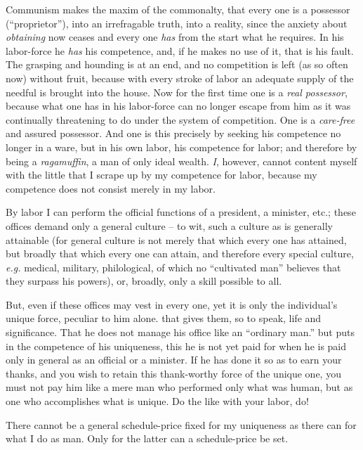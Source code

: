 Communism makes the maxim of the commonalty, that every one is a possessor 
(``proprietor''), into an irrefragable truth, into a reality, since the 
anxiety about \textit{obtaining} now ceases and every one \textit{has} from 
the start what he requires. In his labor-force he \textit{has} his competence, 
and, if he makes no use of it, that is his fault. The grasping and hounding is 
at an end, and no competition is left (as so often now) without fruit, because 
with every stroke of labor an adequate supply of the needful is brought into 
the house. Now for the first time one is a \textit{real possessor}, because 
what one has in his labor-force can no longer escape from him as it was 
continually threatening to do under the system of competition. One is a 
\textit{care-free} and assured possessor. And one is this precisely by seeking 
his competence no longer in a ware, but in his own labor, his competence for 
labor; and therefore by being a \textit{ragamuffin}, a man of only ideal 
wealth. \textit{I}, however, cannot content myself with the little that I 
scrape up by my competence for labor, because my competence does not consist 
merely in my labor.

By labor I can perform the official functions of a president, a minister, 
etc.; these offices demand only a general culture -- to wit, such a culture as 
is generally attainable (for general culture is not merely that which every 
one has attained, but broadly that which every one can attain, and therefore 
every special culture, \textit{e.g.} medical, military, philological, of 
which no ``cultivated man'' believes that they surpass his powers), or, 
broadly, only a skill possible to all.

But, even if these offices may vest in every one, yet it is only the 
individual's unique force, peculiar to him alone. that gives them, so to 
speak, life and significance. That he does not manage his office like an 
``ordinary man.'' but puts in the competence of his uniqueness, this he is 
not yet paid for when he is paid only in general as an official or a minister. 
If he has done it so as to earn your thanks, and you wish to retain this 
thank-worthy force of the unique one, you must not pay him like a mere man who 
performed only what was human, but as one who accomplishes what is unique. Do 
the like with your labor, do!

There cannot be a general schedule-price fixed for my uniqueness as there can 
for what I do as man. Only for the latter can a schedule-price be set.

